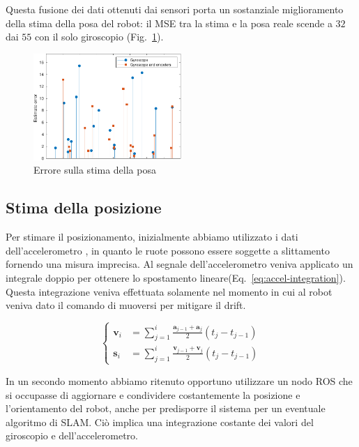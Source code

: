 \documentclass[a4paper]{article}
\begin{document}
	Questa fusione dei dati ottenuti dai sensori porta un sostanziale miglioramento della stima della posa del robot: il MSE tra la stima e la posa reale scende a $ 32 $ dai $ 55 $ con il solo giroscopio (Fig.~\ref{fig:sensor_fusion}).

	\begin{figure}[H]
		\centering
		\includegraphics[width=0.5\textwidth]{./img/sensor_fusion.pdf}
		\caption{Errore sulla stima della posa}
		\label{fig:sensor_fusion}
	\end{figure}
	
	\subsection{Stima della posizione}\label{subsec:Posizionamento}
	Per stimare il posizionamento, inizialmente abbiamo utilizzato i dati
	dell'accelerometro \cite{positioning}, in quanto le ruote possono essere
	soggette a slittamento fornendo una misura imprecisa. Al segnale
	dell'accelerometro veniva applicato un integrale doppio per ottenere lo
	spostamento lineare(Eq.~\ref{eq:accel-integration}). Questa integrazione
	veniva effettuata solamente nel momento in cui al robot veniva dato il
	comando di muoversi per mitigare il drift.

	\begin{equation}\label{eq:accel-integration}
		\begin{cases}
			\textbf{v}_i & = \sum_{j=1}^{i} \frac{\textbf{a} _{j-1}+\textbf{a} _j}{2} \left( t_j-t_{j-1} \right) \\
			\textbf{s}_i & = \sum_{j=1}^{i} \frac{\textbf{v} _{j-1}+\textbf{v} _j}{2} \left( t_j-t_{j-1} \right) 
		\end{cases}
	\end{equation}
	
	In un secondo momento abbiamo ritenuto opportuno utilizzare un nodo ROS che
	si occupasse di aggiornare e condividere costantemente la posizione e
	l'orientamento del robot, anche per predisporre il sistema per un eventuale
	algoritmo di SLAM.  Ciò implica una integrazione costante dei valori del
	giroscopio e dell'accelerometro. 
	
\end{document}
